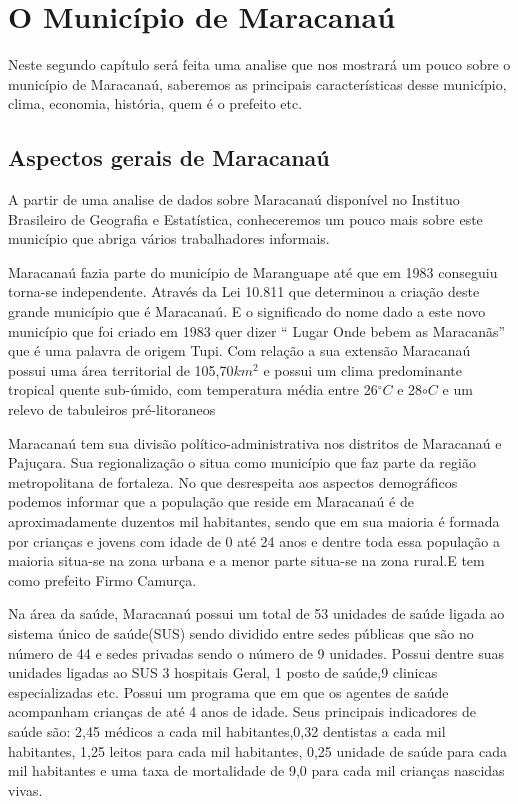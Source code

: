 \chapter{O Município de Maracanaú}

Neste segundo capítulo será feita uma analise que nos mostrará um pouco sobre o município de Maracanaú,
saberemos as principais características desse município, clima, economia, história, quem é o prefeito etc.

\section{Aspectos gerais de Maracanaú}

A partir de uma analise de dados sobre Maracanaú disponível no Instituo Brasileiro de Geografia e Estatística, 
conheceremos um pouco mais sobre este município que abriga vários trabalhadores informais. 

Maracanaú fazia parte do município de Maranguape até que em 1983 conseguiu torna-se independente. Através da Lei 
10.811 que determinou a criação deste grande município que é Maracanaú. E o significado do nome dado a este novo 
município que foi criado em 1983 quer dizer “ Lugar Onde bebem as Maracanãs” que é uma palavra de origem Tupi.
Com relação a sua extensão Maracanaú possui uma área territorial de 105,70$km^2$ e possui um clima predominante 
tropical quente sub-úmido, com temperatura média entre 26$^{\circ}C$ e 28${\circ}C$ e um relevo de tabuleiros pré-litoraneos

Maracanaú tem sua divisão político-administrativa nos distritos de Maracanaú e Pajuçara. Sua regionalização o 
situa como município que faz parte da região metropolitana de fortaleza. No que desrespeita aos aspectos 
demográficos podemos informar que a população que reside em Maracanaú é de aproximadamente duzentos mil 
habitantes, sendo que em sua maioria é formada por crianças e jovens com idade de 0 até 24 anos e dentre 
toda essa população a maioria situa-se na zona urbana e a menor parte situa-se na zona rural.E tem como 
prefeito Firmo Camurça.

Na área da saúde, Maracanaú possui um total de 53 unidades de saúde ligada ao sistema único de saúde(SUS) 
sendo dividido entre sedes públicas  que são no número de 44 e sedes privadas sendo o número de 9 unidades.
Possui dentre suas unidades ligadas ao SUS 3 hospitais Geral, 1 posto de saúde,9 clinicas especializadas 
etc. Possui um programa que em que os agentes de saúde acompanham crianças de até 4 anos de idade. 
Seus principais indicadores de saúde são: 2,45 médicos a cada mil habitantes,0,32 dentistas a cada mil
habitantes, 1,25 leitos para cada mil habitantes, 0,25 unidade de saúde para cada mil habitantes e uma 
taxa de mortalidade de 9,0 para cada mil crianças nascidas vivas.

